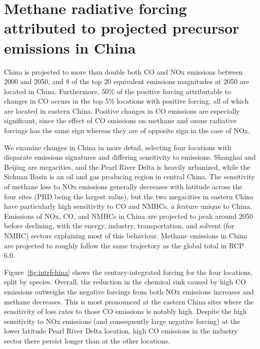 \section{Methane radiative forcing attributed to projected precursor emissions in China}

China is projected to more than double both CO and NOx emissions between 2000 and 2050, and 8 of the top 20 equivalent emissions magnitudes at 2050 are located in China. Furthermore, 50\% of the positive forcing attributable to changes in CO occurs in the top 5\% locations with positive forcing, all of which are located in eastern China. Positive changes in CO emissions are especially significant, since the effect of CO emissions on methane and ozone radiative forcings has the same sign whereas they are of opposite sign in the case of NOx.

We examine changes in China in more detail, selecting four locations with disparate emissions signatures and differing sensitivity to emissions. Shanghai and Beijing are megacities, and the Pearl River Delta is heavily urbanized, while the Sichuan Basin is an oil and gas producing region in central China. The sensitivity of methane loss to NOx emissions generally decreases with latitude across the four sites (PRD being the largest value), but the two megacities in eastern China have particularly high sensitivity to CO and NMHCs, a feature unique to China. Emissions of NOx, CO, and NMHCs in China are projected to peak around 2050 before declining, with the energy, industry, transportation, and solvent (for NMHC) sectors explaining most of this behaviour. Methane emissions in China are projected to roughly follow the same trajectory as the global total in RCP 6.0.

Figure~\ref{fig:intrfchina} shows the century-integrated forcing for the four locations, split by species. Overall, the reduction in the chemical sink caused by high CO emissions outweighs the negative forcings from both NOx emissions increases and methane decreases. This is most pronounced at the eastern China sites where the sensitivity of loss rates to those CO emissions is notably high. Despite the high sensitivity to NOx emissions (and consequently large negative forcing) at the lower latitude Pearl River Delta location, high CO emissions in the industry sector there persist longer than at the other locations.
